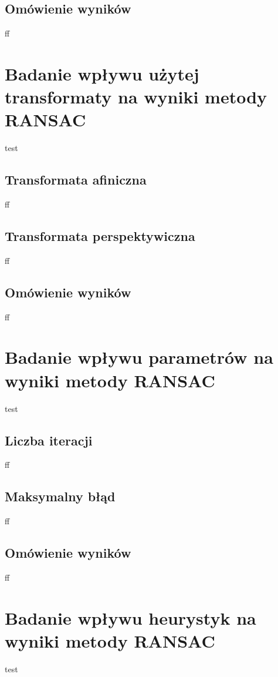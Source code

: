 \documentclass[a4paper,10pt]{article}
\begin{document}
    \subsection{Omówienie wyników}
    ff
    
    \newpage
    \justify
    \section{Badanie wpływu użytej transformaty na wyniki metody RANSAC}
    test
    
    \subsection{Transformata afiniczna}
    ff
    
    \subsection{Transformata perspektywiczna}
    ff
    
    \subsection{Omówienie wyników}
    ff
    
    \newpage
    \justify
    \section{Badanie wpływu parametrów  na wyniki metody RANSAC}
    test
    
    \subsection{Liczba iteracji}
    ff
    
    \subsection{Maksymalny błąd}
    ff
    
    \subsection{Omówienie wyników}
    ff
    
    \newpage
    \justify
    \section{Badanie wpływu heurystyk na wyniki metody RANSAC}
    test
    
\end{document}
